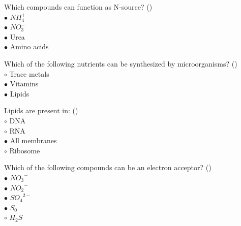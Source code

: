 \documentclass[]{beamer}
\begin{document}
\begin{frame}[shrink] {}
\addtocounter{questions}{1}
\color{blue}
Which compounds can function as N-source?   ()\\
\color{black}
\setlength{\parindent}{-0.4cm}
{\color{red}$\bullet$} $NH_{4}^{+}$ \\
{\color{red}$\bullet$} $NO_{3}^{-}$ \\
{\color{red}$\bullet$} Urea\\
{\color{red}$\bullet$} Amino acids\\
\end{frame}

\begin{frame}[shrink] {}
\addtocounter{questions}{1}
\color{blue}
Which of the following nutrients can be synthesized by microorganisms?   ()\\
\color{black}
\setlength{\parindent}{-0.4cm}
{\color{red}$\circ$}  Trace metals\\
{\color{red}$\bullet$} Vitamins\\
{\color{red}$\bullet$} Lipids \\
\end{frame}

\begin{frame}[shrink] {}
\addtocounter{questions}{1}
\color{blue}
Lipids are present in:   ()\\
\color{black}
\setlength{\parindent}{-0.4cm}
{\color{red}$\circ$} DNA\\
{\color{red}$\circ$} RNA\\
{\color{red}$\bullet$} All membranes\\
{\color{red}$\circ$} Ribosome \\
\end{frame}

\begin{frame}[shrink] {}
\addtocounter{questions}{1}
\color{blue}
Which of the following compounds can be an electron acceptor?   ()\\
\color{black}
\setlength{\parindent}{-0.4cm}
{\color{red}$\bullet$}  ${NO_{3}}^{-}$\\
{\color{red}$\bullet$} ${NO_{2}}^{-}$\\
{\color{red}$\bullet$} ${SO_{4}}^{2-}$\\
{\color{red}$\bullet$} $S_0$\\
{\color{red}$\circ$} $H_{2}S$ \\
\end{frame}
\end{document}
